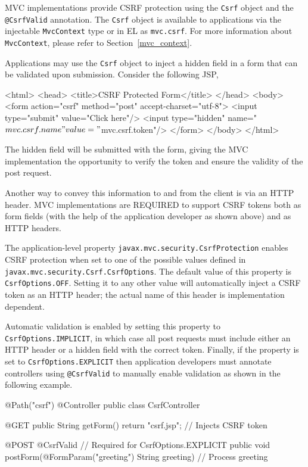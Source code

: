 MVC implementations provide CSRF protection using the {\tt Csrf} object
and the {\tt @CsrfValid} annotation. The {\tt Csrf} object is available to applications
via the injectable {\tt MvcContext} type or in EL as {\tt mvc.csrf}. For more information
about {\tt MvcContext}, please refer to Section~\ref{mvc_context}. 

Applications may use the {\tt Csrf} object to inject a hidden field in a form that can be validated 
upon submission. Consider the following JSP,

\begin{listing}{1}
<html>
<head>
    <title>CSRF Protected Form</title>
</head>
<body>
    <form action="csrf" method="post" accept-charset="utf-8">
        <input type="submit" value="Click here"/>
        <input type="hidden" name="${mvc.csrf.name}" 
                             value="${mvc.csrf.token}"/>
    </form>
</body>
</html>
\end{listing}

The hidden field will be submitted with the form, giving the MVC implementation
the opportunity to verify the token and ensure the validity of the post request. 

Another way to convey this information to and from the client is via an HTTP
header. MVC implementations are REQUIRED to support CSRF tokens both
as form fields (with the help of the application developer as shown above) and
as HTTP headers.

The application-level property {\tt javax.mvc.security.CsrfProtection} enables
 CSRF protection when set to one of the possible values defined in
{\tt javax.mvc.security.Csrf.CsrfOptions}. The default value of this property is
{\tt CsrfOptions.OFF}. Setting it to any other value will automatically inject a
CSRF token as an HTTP header; the actual name of this header is 
implementation dependent.

Automatic validation is enabled by setting this
property to {\tt CsrfOptions.IMPLICIT}, in which case all post requests
must include either an HTTP header or a hidden field with the correct token.
Finally, if the property is set to {\tt CsrfOptions.EXPLICIT} then application
developers must annotate controllers using {\tt @CsrfValid} to manually
enable validation  as shown in the following example.

\begin{listing}{1}
@Path("csrf")
@Controller
public class CsrfController {

    @GET
    public String getForm() {
        return "csrf.jsp";     // Injects CSRF token
    }

    @POST
    @CsrfValid		           // Required for CsrfOptions.EXPLICIT
    public void postForm(@FormParam("greeting") String greeting) {
        // Process greeting
    }
}
 \end{listing}

